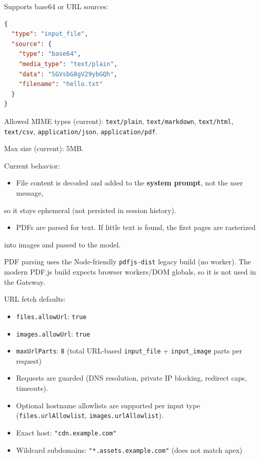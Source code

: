 Supports base64 or URL sources:

\begin{lstlisting}[language=json]
{
  "type": "input_file",
  "source": {
    "type": "base64",
    "media_type": "text/plain",
    "data": "SGVsbG8gV29ybGQh",
    "filename": "hello.txt"
  }
}
\end{lstlisting}


Allowed MIME types (current): \texttt{text/plain}, \texttt{text/markdown}, \texttt{text/html}, \texttt{text/csv},
\texttt{application/json}, \texttt{application/pdf}.

Max size (current): 5MB.

Current behavior:

\begin{itemize}
  \item File content is decoded and added to the \textbf{system prompt}, not the user message,
\end{itemize}

so it stays ephemeral (not persisted in session history).
\begin{itemize}
  \item PDFs are parsed for text. If little text is found, the first pages are rasterized
\end{itemize}

into images and passed to the model.

PDF parsing uses the Node-friendly \texttt{pdfjs-dist} legacy build (no worker). The modern
PDF.js build expects browser workers/DOM globals, so it is not used in the Gateway.

URL fetch defaults:

\begin{itemize}
  \item \texttt{files.allowUrl}: \texttt{true}
  \item \texttt{images.allowUrl}: \texttt{true}
  \item \texttt{maxUrlParts}: \texttt{8} (total URL-based \texttt{input\_file} + \texttt{input\_image} parts per request)
  \item Requests are guarded (DNS resolution, private IP blocking, redirect caps, timeouts).
  \item Optional hostname allowlists are supported per input type (\texttt{files.urlAllowlist}, \texttt{images.urlAllowlist}).
  \item Exact host: \texttt{"cdn.example.com"}
  \item Wildcard subdomains: \texttt{"*.assets.example.com"} (does not match apex)
\end{itemize}


